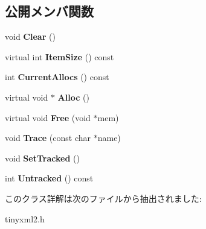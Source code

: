 \subsection*{公開メンバ関数}
\begin{DoxyCompactItemize}
\item 
\mbox{\label{classtinyxml2_1_1_mem_pool_t_a22d595caa0e9d23aa080f49ca6475fdd}} 
void {\bfseries Clear} ()
\item 
\mbox{\label{classtinyxml2_1_1_mem_pool_t_a54e4d9b343459ef1731314a99877ff35}} 
virtual int {\bfseries Item\+Size} () const
\item 
\mbox{\label{classtinyxml2_1_1_mem_pool_t_a445a6c80151ba6268b24ec62a7c84d74}} 
int {\bfseries Current\+Allocs} () const
\item 
\mbox{\label{classtinyxml2_1_1_mem_pool_t_a810fd2b0caf56b8b688e55f2768f96c7}} 
virtual void $\ast$ {\bfseries Alloc} ()
\item 
\mbox{\label{classtinyxml2_1_1_mem_pool_t_a408ce0918e9d3d5e5e1cc4896944875f}} 
virtual void {\bfseries Free} (void $\ast$mem)
\item 
\mbox{\label{classtinyxml2_1_1_mem_pool_t_a47eefbd934ef70d973ea41d41ab5f239}} 
void {\bfseries Trace} (const char $\ast$name)
\item 
\mbox{\label{classtinyxml2_1_1_mem_pool_t_aee3c611215ae08cce41a940bf2763027}} 
void {\bfseries Set\+Tracked} ()
\item 
\mbox{\label{classtinyxml2_1_1_mem_pool_t_a3bcdc302ae15d2810e11192321a8f5f1}} 
int {\bfseries Untracked} () const
\end{DoxyCompactItemize}


このクラス詳解は次のファイルから抽出されました\+:\begin{DoxyCompactItemize}
\item 
tinyxml2.\+h\end{DoxyCompactItemize}
